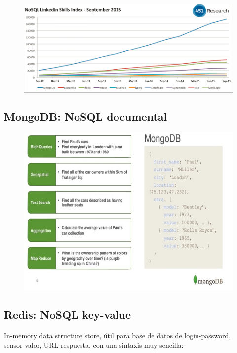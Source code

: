 \documentclass[]{book}
\begin{document}
\begin{figure}
\centering
\includegraphics{images/451ResearchSkills.png}
\caption{}
\end{figure}

\subsection{MongoDB: NoSQL documental}\label{mongodb-nosql-documental}

\begin{figure}
\centering
\includegraphics{images/MongoDB.jpg}
\caption{}
\end{figure}

\subsection{Redis: NoSQL key-value}\label{redis-nosql-key-value}

In-memory data structure store, útil para base de datos de
login-password, sensor-valor, URL-respuesta, con una sintaxis muy
sencilla:
\end{document}
